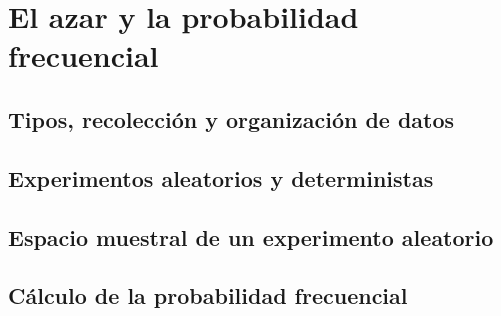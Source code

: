 \thispagestyle{plain}

\section{El azar y la probabilidad frecuencial}

\subsection{Tipos, recolección y organización de datos}

\subsection{Experimentos aleatorios y deterministas}

\subsection{Espacio muestral de un experimento aleatorio}

\subsection{Cálculo de la probabilidad frecuencial}
\newpage
